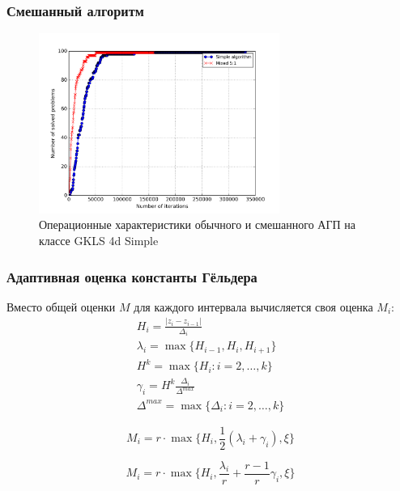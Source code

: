 \documentclass[aspectratio=1610]{beamer}
\begin{document}
\begin{frame}
  \frametitle{Смешанный алгоритм}
  \begin{figure}
    \center
      \includegraphics[width=0.7\textwidth]{mixed_op4d.png}
      \caption*{Операционные характеристики обычного и смешанного АГП на классе GKLS 4d Simple}
  \end{figure}
\end{frame}

\begin{frame}
\frametitle{Адаптивная оценка константы Гёльдера}
  Вместо общей оценки \(M\) для каждого интервала вычисляется своя оценка \(M_i\):
  \begin{displaymath}
    \begin{array}{lr}
      H_i=\frac{|z_i-z_{i-1}|}{\Delta_i} \\
      \lambda_i=\max\{H_{i-1},H_i,H_{i+1}\} \\
      H^k=\max\{H_i:i=2,\dots ,k\} \\
      \gamma_i=H^k\frac{\Delta_i}{\Delta^{max}} \\
      \Delta^{max}=\max\{\Delta_{i}:i=2,\dots ,k\}
    \end{array}
  \end{displaymath}

  \begin{displaymath}
    M_i=r\cdot \max\{H_i, \frac{1}{2}(\lambda_i+\gamma_i),\xi\}
  \end{displaymath}

  \begin{displaymath}
    M_i=r\cdot \max\{H_i, \frac{\lambda_i}{r}+\frac{r-1}{r}\gamma_i,\xi\}
  \end{displaymath}
\end{frame}
\end{document}

